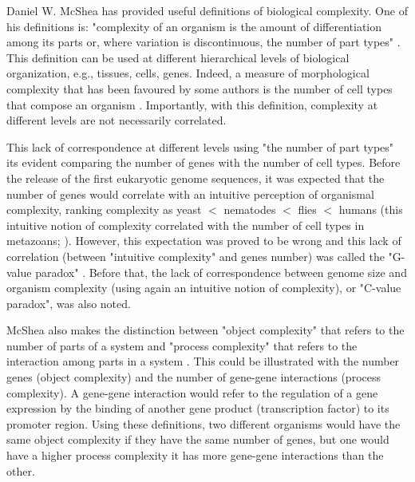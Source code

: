 Daniel W. McShea has provided useful definitions of biological complexity. One of his definitions is: "complexity of an organism is the amount of differentiation among its parts or, where variation is discontinuous, the number of part types" \citep{McShea1996,McShea2015}.
This definition can be used at different hierarchical levels of biological organization, e.g., tissues, cells, genes.
Indeed, a measure of morphological complexity that has been favoured by some authors 
is the number of cell types that compose an organism 
	\citep{Valentine1994,Bell1997,Bonner2004}.
Importantly, with this definition, complexity at different levels are not necessarily correlated.

This lack of correspondence at different levels using "the number of part types" its evident comparing the number of genes with the number of cell types. Before the release of the first eukaryotic genome sequences, it was expected that the number of genes would correlate with an intuitive perception of organismal complexity, ranking complexity as yeast $<$ nematodes $<$ flies $<$ humans \citep{Hahn2002} (this intuitive notion of complexity correlated with the number of cell types in metazoans; \citealp{Valentine1994}). However, this expectation was proved to be wrong and this lack of correlation (between "intuitive complexity" and genes number) was called the "G-value paradox" \citep{Hahn2002}.
Before that, the lack of correspondence between genome size and organism complexity (using again an intuitive notion of complexity),  or "C-value paradox", was also noted.


McShea also makes the distinction between "object complexity" that refers to the number of parts of a system and "process complexity" that refers to the interaction among parts in a system \citep{McShea1996}.
This could be illustrated with the number genes (object complexity) and the number of gene-gene interactions (process complexity). A gene-gene interaction would refer to the regulation of a gene expression by the binding of another gene product (transcription factor) to its promoter region.
Using these definitions, two different organisms would have the same object complexity if they have the same number of genes, but one would have a higher process complexity it has more gene-gene interactions than the other.


